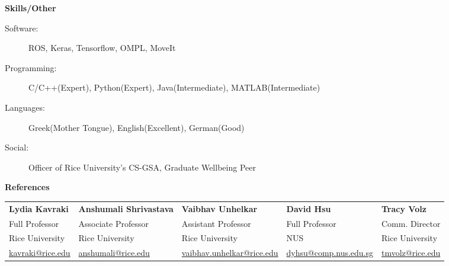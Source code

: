 \documentclass[letterpaper,11pt]{article}
\newcommand{\resheading}[1]{{\large \colorbox{mygrey}{\begin{minipage}{\textwidth}{\textbf{#1 \vphantom{p\^{E}}}}\end{minipage}}}}
\begin{document}
\resheading{Skills/Other}
\begin{description}
    \item[Software:] ROS, Keras, Tensorflow, OMPL, MoveIt 
    \item[Programming:] C/C++(Expert), Python(Expert), Java(Intermediate), MATLAB(Intermediate) 
    \item[Languages:] Greek(Mother Tongue), English(Excellent), German(Good) 
    \item[Social:] Officer of Rice University's CS-GSA, Graduate Wellbeing Peer
\end{description}


\resheading{References}
\begin{center}
	\vspace{-0.5em}
\begin{tabular}{p{3.3cm}p{4.8cm}p{4.5cm}p{4cm}p{3.6cm}}
\textbf{Lydia Kavraki}  & \textbf{Anshumali Shrivastava} & \textbf{Vaibhav Unhelkar}  & \textbf{David Hsu} & \textbf{Tracy Volz}\\
Full Professor   & Associate Professor & Assistant Professor   & Full Professor & Comm. Director  \\
Rice University   & Rice University & Rice University  & NUS & Rice University\\
\footnotesize\href{mailto:kavraki@rice.edu}{kavraki@rice.edu} & \footnotesize\href{mailto:anshumali@rice.edu}{anshumali@rice.edu} & \footnotesize\href{mailto:vaibhav.unhelkar@rice.edu}{vaibhav.unhelkar@rice.edu}  & \footnotesize\href{mailto:dyhsu@comp.nus.edu.sg}{dyhsu@comp.nus.edu.sg} & \footnotesize\href{mailto:tmvolz@rice.edu}{tmvolz@rice.edu}
\end{tabular}
\end{center}
\end{document}
